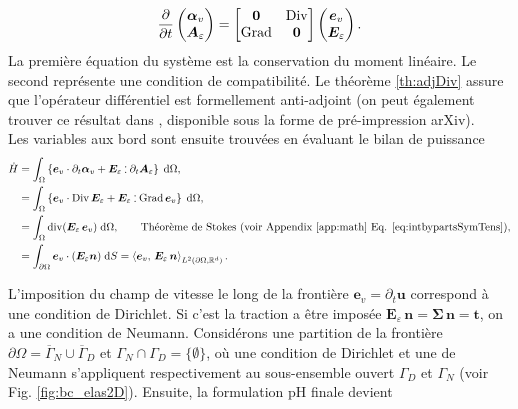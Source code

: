 \begin{equation}
\diffp{}{t}
\begin{pmatrix}
\bm{\alpha}_v \\
\bm{A}_\varepsilon
\end{pmatrix} = 
\begin{bmatrix}
\bm{0} & \Div \\
\Grad & \bm{0} \\
\end{bmatrix}
\begin{pmatrix}
\bm{e}_v \\
\bm{E}_\varepsilon
\end{pmatrix}.
\end{equation}
La première équation du système est la conservation du moment linéaire. Le second représente une condition de compatibilité. Le théorème \ref{th:adjDiv} assure que l'opérateur différentiel est formellement anti-adjoint (on peut également trouver ce résultat dans \cite[Lemme 3.3] {pauly2020elasticity}, disponible sous la forme de pré-impression arXiv). \\

Les variables aux bord sont ensuite trouvées en évaluant le bilan de puissance
\begin{equation}
\begin{aligned}
\dot{H} &= \int_{\Omega} \left\{ \bm{e}_v \cdot \partial_t \bm\alpha_v + \bm{E}_\varepsilon \cddot \partial_t \bm{A}_\varepsilon \right\} \d\Omega, \\
&= \int_{\Omega} \left\{\bm{e}_v \cdot \Div \bm{E}_\varepsilon + \bm{E}_\varepsilon \cddot \Grad \bm{e}_v \right\}\d\Omega,\\
&= \int_{\Omega} \div(\bm{E}_\varepsilon \, \bm{e}_v) \d\Omega, \qquad \text{Théorème de Stokes (voir  Appendix \ref{app:math} Eq. \eqref{eq:intbypartsSymTens}}), \\
&= \int_{\partial \Omega} \bm{e}_v \cdot (\bm{E}_\varepsilon\bm{n}) \d{S} = \inner[L^2(\partial\Omega, \bbR^d)]{\bm{e}_v}{\bm{E}_\varepsilon \, \bm{n}}.
\end{aligned}
\end{equation}

L'imposition du champ de vitesse le long de la frontière $ \bm{e}_v = \partial_t \bm{u} $ correspond à une condition de Dirichlet. Si c'est la traction a être imposée $ \bm{E}_\varepsilon \, \bm{n} = \bm{\Sigma} \, \bm{n} = \bm{t}$, on a une condition de Neumann. Considérons une partition de la frontière $\partial \Omega = \overline{\Gamma}_N \cup \overline{\Gamma}_D $ et $\Gamma_N \cap \Gamma_D = \{\emptyset\} $, où une condition de Dirichlet et une de Neumann s'appliquent respectivement au sous-ensemble ouvert $\Gamma_D $ et $\Gamma_N $ (voir Fig. \ref{fig:bc_elas2D}). Ensuite, la formulation pH finale devient

